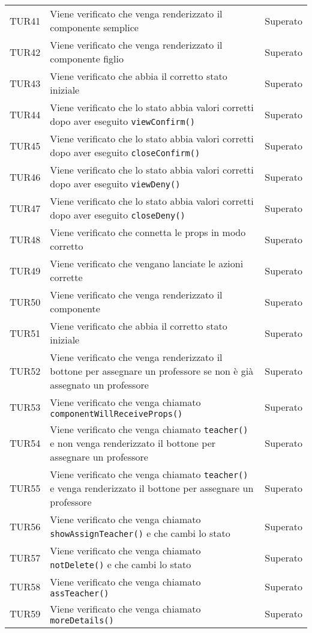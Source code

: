 \documentclass[PianoDiQualifica.tex]{subfiles}
\begin{document}
\begin{longtable}[H]{P{2cm}P{8.5cm}P{3cm}}
	TUR41 & Viene verificato che venga renderizzato il componente semplice & Superato \\ 
	TUR42 & Viene verificato che venga renderizzato il componente figlio & Superato \\ 
	TUR43 & Viene verificato che abbia il corretto stato iniziale & Superato \\ 
	TUR44 & Viene verificato che lo stato abbia valori corretti dopo aver eseguito \texttt{viewConfirm()} & Superato \\ 
	TUR45 & Viene verificato che lo stato abbia valori corretti dopo aver eseguito \texttt{closeConfirm()} & Superato \\ 
	TUR46 & Viene verificato che lo stato abbia valori corretti dopo aver eseguito \texttt{viewDeny()} & Superato \\ 
	TUR47 & Viene verificato che lo stato abbia valori corretti dopo aver eseguito \texttt{closeDeny()} & Superato \\ 
	TUR48 & Viene verificato che connetta le props in modo corretto & Superato \\ 
	TUR49 & Viene verificato che vengano lanciate le azioni corrette & Superato \\ 
	TUR50 & Viene verificato che venga renderizzato il componente & Superato \\ 
	TUR51 & Viene verificato che abbia il corretto stato iniziale & Superato \\ 
	TUR52 & Viene verificato che venga renderizzato il bottone per assegnare un professore se non è già assegnato un professore & Superato \\ 
	TUR53 & Viene verificato che venga chiamato \texttt{componentWillReceiveProps()} & Superato \\ 
	TUR54 & Viene verificato che venga chiamato \texttt{teacher()} e non venga renderizzato il bottone per assegnare un professore & Superato \\ 
	TUR55 & Viene verificato che venga chiamato \texttt{teacher()} e venga renderizzato il bottone per assegnare un professore & Superato \\ 
	TUR56 & Viene verificato che venga chiamato \texttt{showAssignTeacher()} e che cambi lo stato & Superato \\ 
	TUR57 & Viene verificato che venga chiamato \texttt{notDelete()} e che cambi lo stato & Superato \\ 
	TUR58 & Viene verificato che venga chiamato \texttt{assTeacher()} & Superato \\ 
	TUR59 & Viene verificato che venga chiamato \texttt{moreDetails()} & Superato \\ 

\end{longtable}
\end{document}
